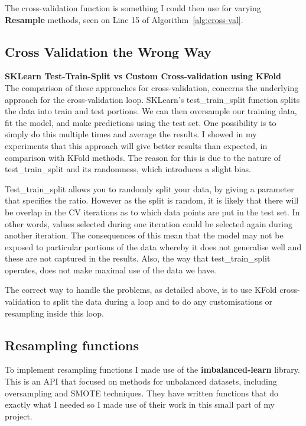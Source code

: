 \documentclass[12pt,a4paper,twoside]{report}
\begin{document}
The cross-validation function is something I could then use for varying \textbf{Resample} methods, seen on Line 15 of Algorithm~\ref{alg:cross-val}.

\subsection{Cross Validation the Wrong Way}

\textbf{SKLearn Test-Train-Split vs Custom Cross-validation using KFold}\\
The comparison of these approaches for cross-validation, concerns the underlying approach for the cross-validation loop. SKLearn's test\_train\_split function splits the data into train and test portions. We can then oversample our training data, fit the model, and make predictions using the test set.
One possibility is to simply do this multiple times and average the results.
I showed in my experiments that this approach will give better results than expected, in comparison with KFold methods. The reason for this is due to the nature of test\_train\_split and its randomness, which introduces a slight bias.

Test\_train\_split allows you to randomly split your data, by giving a parameter that specifies the ratio. However as the split is random, it is likely that there will be overlap in the CV iterations as to which data points are put in the test set. In other words, values selected during one iteration could be selected again during another iteration.
The consequences of this mean that the model may not be exposed to particular portions of the data whereby it does not generalise well and these are not captured in the results. Also, the way that test\_train\_split operates, does not make maximal use of the data we have.

The correct way to handle the problems, as detailed above, is to use KFold cross-validation to split the data during a loop and to do any customisations or resampling inside this loop.

\subsection{Resampling functions}
To implement resampling functions I made use of the \textbf{imbalanced-learn}\cite{JMLR:v18:16-365} library. This is an API that focused on methods for unbalanced datasets, including oversampling and SMOTE techniques. They have written functions that do exactly what I needed so I made use of their work in this small part of my project. 
\end{document}

